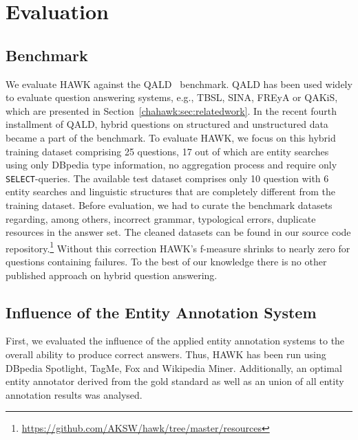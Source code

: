 
\section{Evaluation}
\label{chahawk:sec:evaluation}

\subsection{Benchmark}

We evaluate HAWK against the QALD~\cite{qald4} benchmark.
QALD has been used widely to evaluate question answering systems, e.g., TBSL, SINA, FREyA or QAKiS, which are presented in Section~\ref{chahawk:sec:relatedwork}.
In the recent fourth installment of QALD, hybrid questions on structured and unstructured data became a part of the benchmark.
To evaluate HAWK, we focus on this hybrid training dataset comprising 25 questions, 17 out of which are entity searches using only DBpedia type information, no aggregation process and require only \texttt{SELECT}-queries. 
The available test dataset comprises only 10 question with 6 entity searches and linguistic structures that are completely different from the training dataset.
Before evaluation, we had to curate the benchmark datasets regarding, among others, incorrect grammar, typological errors, duplicate resources in the answer set.
The cleaned datasets can be found in our source code repository.\footnote{\url{https://github.com/AKSW/hawk/tree/master/resources}}
Without this correction HAWK's f-measure shrinks to nearly zero for questions containing failures.
To the best of our knowledge there is no other published approach on hybrid question answering.
 
\subsection{Influence of the Entity Annotation System}
First, we evaluated the influence of the applied entity annotation systems to the overall ability to produce correct answers.
Thus, HAWK has been run using DBpedia Spotlight, TagMe, Fox and Wikipedia Miner. 
Additionally, an optimal entity annotator derived from the gold standard as well as an union of all entity annotation results was analysed. %

